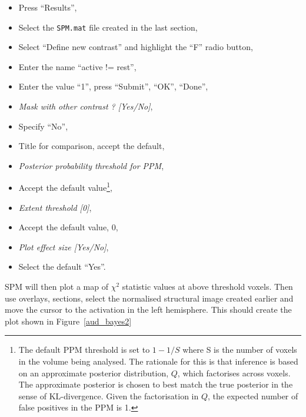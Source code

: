 \begin{itemize}
\item Press ``Results'',
\item Select the \texttt{SPM.mat} file created in the last section,
\item Select ``Define new contrast'' and highlight the ``F'' radio button,
\item Enter the name ``active != rest'',
\item Enter the value ``1'', press ``Submit'', ``OK'', ``Done'',
\item \emph{Mask with other contrast ? [Yes/No]},
\item Specify ``No'',
\item Title for comparison, accept the default,
\item \emph{Posterior probability threshold for PPM},
\item Accept the default value\footnote{The default PPM threshold is set to $1-1/S$ where S is the number of voxels in the volume being analysed. The rationale for this is that inference is based on an approximate posterior distribution, $Q$, which factorises across voxels. The approximate posterior is chosen to best match the true posterior in the sense of KL-divergence. Given the factorisation in $Q$, the expected number of false positives in the PPM is 1. },
\item \emph{Extent threshold [0]},
\item Accept the default value, 0,
\item \emph{Plot effect size [Yes/No]},
\item Select the default ``Yes''.
\end{itemize}

SPM will then plot a map of $\chi^2$ statistic values at above threshold voxels. Then use overlays, sections, select the normalised structural image created earlier and move the cursor to the activation in the left hemisphere. This should create the plot shown in Figure~\ref{aud_bayes2}

